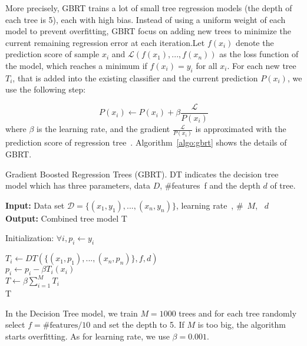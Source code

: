 
More precisely, GBRT trains a lot of small tree regression models (the depth of each tree is 5), each with high bias. Instead of using a uniform weight of each model to prevent overfitting, GBRT focus on adding new trees to minimize the current remaining regression error at each iteration.Let $f(x_i)$ denote the prediction score of sample $x_i$ and $\mathcal{L}(f(x_1),...,f(x_n))$ as the loss function of the model, which reaches a minimum if $f(x_i) = y_i$ for all $x_i$. For each new tree $T_i$, that is added into the existing classifier and the current prediction $P(x_i)$, we use the following step:

$$P(x_i) \leftarrow P(x_i) + \beta \frac{\mathcal{L}}{P(x_i)}$$
\noindent where $\beta$ is the learning rate, and the gradient $\frac{\mathcal{L}}{P(x_i)}$ is approximated with the prediction score of regression tree~\cite{zheng2007general}. Algorithm~\ref{algo:gbrt} shows the details of GBRT.

\begin{algorithm}
\caption{Gradient Boosted Regression Trees (GBRT). DT indicates the decision tree model which has three parameters, data $D$, #features~f and the depth $d$ of tree.}\label{algo:gbrt}
\begin{algorithmic}
\State \textbf{Input:} Data set $\mathcal{D} =\{(x_1, y_1),..., (x_n, y_n)\}$, learning rate~\beta, \#~$M$, ~$d$ \\
\State \textbf{Output:} Combined tree model T

\State Initialization: $\forall i, p_i \leftarrow y_i$

 {
    $T_i \leftarrow DT(\{(x_1, p_1),..., (x_n, p_n)\}, f, d)$ \\
     {
        $p_i \leftarrow p_i - \beta T_i(x_i)$\\
    }
}
$T \leftarrow \beta \sum_{i = 1}^M T_i$\\
\Return T\\
\end{algorithmic}
\end{algorithm}

 In the Decision Tree model, we train $M = 1000$ trees and for each tree randomly select $f = \#\mbox{features} / 10$ and set the depth to 5. If $M$ is too big, the algorithm starts overfitting. As for learning rate, we use $\beta = 0.001$.


